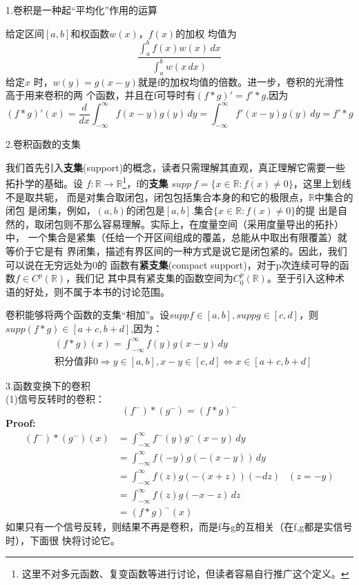 \documentclass{ctexbook}
\begin{document}
\noindent 1.卷积是一种起“平均化”作用的运算

给定区间$[a,b]$和权函数$w(x)$，$f(x)$的加权
均值为\[\frac{\int_{a}^{b}f(x)w(x)\,dx}{\int_{a}^{b}w(x\,dx)}\]给定$x$
时，$w(y)=g(x-y)$就是f的加权均值的倍数。进一步，卷积的光滑性高于用来卷积的两
个函数，并且在f可导时有$(f*g)'=f'*g$,因为
\[(f*g)'(x)=\frac{d}{dx}\int_{-\infty}^{\infty}f(x-y)g(y)\,dy=\int_{-\infty}^{\infty}f'(x-y)g(y)\,dy=f'*g\]

\noindent 2.卷积函数的支集

我们首先引入\textbf{支集}(support)的概念，读者只需理解其直观，真正理解它需要一些拓扑学的基础。设
$f:\mathbb{R}\to \mathbb{R}$\footnote{这里不对多元函数、复变函数等进行讨论，但读者容易自行推广这个定义。}，f的\textbf{支集}
$supp\ f=\overline{\{x\in\mathbb{R}:f(x)\neq 0\}}$，这里上划线不是取共轭，
而是对集合取闭包，闭包包括集合本身的和它的极限点，$\mathbb{R}$中集合的闭包
是闭集，例如，$(a,b)$的闭包是$[a,b]$.集合$\{x\in\mathbb{R}:f(x)\neq 0\}$的提
出是自然的，取闭包则不那么容易理解。实际上，在度量空间（采用度量导出的拓扑）中，
一个集合是紧集（任给一个开区间组成的覆盖，总能从中取出有限覆盖）就等价于它是有
界闭集，描述有界区间的一种方式是说它是闭包紧的。因此，我们可以说在无穷远处为0的
函数有\textbf{紧支集}(compact support)，对于p次连续可导的函数$f\in C^p(\mathbb{R})$，我们记
其中具有紧支集的函数空间为$C_0^p(\mathbb{R})$。至于引入这种术语的好处，则不属于本书的讨论范围。

卷积能够将两个函数的支集“相加”。设$supp f\in [a,b],supp g\in [c,d]$，则
$supp (f*g)\in [a+c,b+d]$,因为：
\begin{align*}
     & (f*g)(x) =\int_{-\infty}^{\infty}f(y)g(x-y)\,dy                               \\
     & \text{积分值非0}\Rightarrow y\in [a,b],x-y\in [c,d]\Leftrightarrow x\in [a+c,b+d]
\end{align*}

\noindent 3.函数变换下的卷积\\
(1)信号反转时的卷积：
\[(f^-)*(g^-)=(f*g)^-\]
\textbf{Proof:}
\begin{align*}
    (f^-)*(g^-)(x) & =\int_{-\infty}^{\infty}f^-(y)g^-(x-y)\,dy          \\
                   & =\int_{-\infty}^{\infty}f(-y)g(-(x-y))\,dy          \\
                   & =\int_{-\infty}^{\infty}f(z)g(-(x+z))(-dz) & (z=-y) \\
                   & =\int_{-\infty}^{\infty}f(z)g(-x-z)\,dz             \\
                   & =(f*g)^-(x)
\end{align*}
如果只有一个信号反转，则结果不再是卷积，而是f与g的互相关（在f,g都是实信号时），下面很
快将讨论它。
\end{document}
